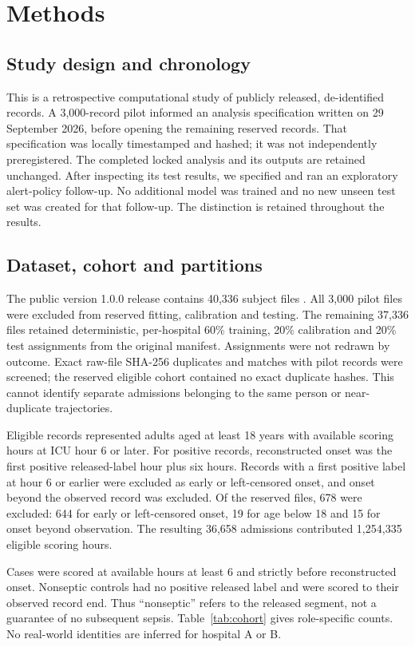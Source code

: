 \documentclass[11pt,a4paper]{article}
\begin{document}
\section{Methods}
\subsection{Study design and chronology}
This is a retrospective computational study of publicly released, de-identified records. A 3,000-record pilot informed an analysis specification written on 29 September 2026, before opening the remaining reserved records. That specification was locally timestamped and hashed; it was not independently preregistered. The completed locked analysis and its outputs are retained unchanged. After inspecting its test results, we specified and ran an exploratory alert-policy follow-up. No additional model was trained and no new unseen test set was created for that follow-up. The distinction is retained throughout the results.

\subsection{Dataset, cohort and partitions}
The public version 1.0.0 release contains 40,336 subject files \cite{reynadata}. All 3,000 pilot files were excluded from reserved fitting, calibration and testing. The remaining 37,336 files retained deterministic, per-hospital 60\% training, 20\% calibration and 20\% test assignments from the original manifest. Assignments were not redrawn by outcome. Exact raw-file SHA-256 duplicates and matches with pilot records were screened; the reserved eligible cohort contained no exact duplicate hashes. This cannot identify separate admissions belonging to the same person or near-duplicate trajectories.

Eligible records represented adults aged at least 18 years with available scoring hours at ICU hour 6 or later. For positive records, reconstructed onset was the first positive released-label hour plus six hours. Records with a first positive label at hour 6 or earlier were excluded as early or left-censored onset, and onset beyond the observed record was excluded. Of the reserved files, 678 were excluded: 644 for early or left-censored onset, 19 for age below 18 and 15 for onset beyond observation. The resulting 36,658 admissions contributed 1,254,335 eligible scoring hours.

Cases were scored at available hours at least 6 and strictly before reconstructed onset. Nonseptic controls had no positive released label and were scored to their observed record end. Thus ``nonseptic'' refers to the released segment, not a guarantee of no subsequent sepsis. Table~\ref{tab:cohort} gives role-specific counts. No real-world identities are inferred for hospital A or B.

\end{document}
